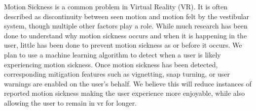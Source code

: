 Motion Sickness is a common problem in Virtual Reality (VR).
It is often described as discontinuity between seen motion and motion felt by the vestibular system, though multiple other factors play a role.
While much research has been done to understand why motion sickness occurs and when it is happening in the user, little has been done to prevent motion sickness as or before it occurs.
We plan to use a machine learning algorithm to detect when a user is likely experiencing motion sickness.
Once motion sickness has been detected, corresponding mitigation features such as vignetting, snap turning, or user warnings are enabled on the user's behalf.
We believe this will reduce instances of reported motion sickness making the user experience more enjoyable, while also allowing the user to remain in vr for longer. %





